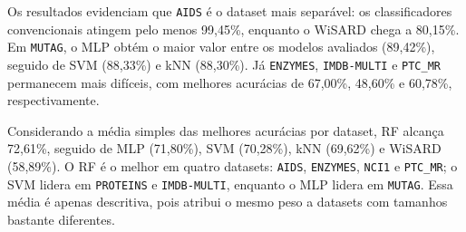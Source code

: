 \documentclass[12pt]{article}
\begin{document}
\begin{table}[ht]
\centering
\caption{Melhor acurácia média (\%) e desvio padrão entre C1 e C5 para cada dataset e classificador.}
\label{tab:results}
\end{table}

Os resultados evidenciam que \texttt{AIDS} é o dataset mais separável: os classificadores convencionais atingem pelo menos 99,45\%, enquanto o WiSARD chega a 80,15\%. Em \texttt{MUTAG}, o MLP obtém o maior valor entre os modelos avaliados (89,42\%), seguido de SVM (88,33\%) e kNN (88,30\%). Já \texttt{ENZYMES}, \texttt{IMDB-MULTI} e \texttt{PTC\_MR} permanecem mais difíceis, com melhores acurácias de 67,00\%, 48,60\% e 60,78\%, respectivamente.

Considerando a média simples das melhores acurácias por dataset, RF alcança 72,61\%, seguido de MLP (71,80\%), SVM (70,28\%), kNN (69,62\%) e WiSARD (58,89\%). O RF é o melhor em quatro datasets: \texttt{AIDS}, \texttt{ENZYMES}, \texttt{NCI1} e \texttt{PTC\_MR}; o SVM lidera em \texttt{PROTEINS} e \texttt{IMDB-MULTI}, enquanto o MLP lidera em \texttt{MUTAG}. Essa média é apenas descritiva, pois atribui o mesmo peso a datasets com tamanhos bastante diferentes.
\end{document}
